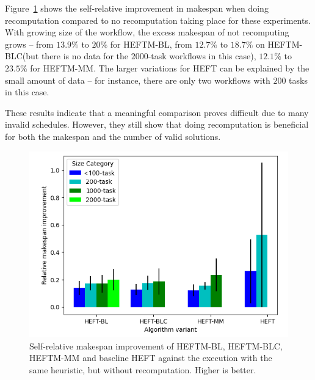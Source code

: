 \documentclass[conference]{IEEEtran}
\newcommand{\algo}[1]{\textsc{#1}}
\newcommand{\heft}{\algo{HEFT}\xspace}
\newcommand{\heftmm}{\algo{HEFTM-MM}\xspace}
\newcommand{\heftbl}{\algo{HEFTM-BL}\xspace}
\newcommand{\heftblc}{\algo{HEFTM-BLC}\xspace}
\newcommand{\new}[1]{{#1}}
\begin{document}
Figure~\ref{fig:updates-ms} shows \new{the self-relative improvement in makespan when doing recomputation 
compared to no recomputation taking place} for these experiments.
With growing size of the workflow, the excess makespan of not recomputing grows -- from $13.9\%$ to $20\%$ for \heftbl,
from $12.7\%$ to $18.7\%$ on \heftblc (but there is no data for the $2000$-task workflows in this case),
$12.1\%$ to $23.5\%$ for \heftmm.
The larger variations for \heft can be explained by the small amount of data -- for instance, there are
only \new{two workflows with  $200$ tasks in this case.}

\new{
These results indicate that a meaningful comparison proves difficult due to
many invalid schedules. However, they still show that doing recomputation 
is beneficial for both the makespan and the number of valid solutions.
}


\begin{figure}[tb]
    \centering
    \includegraphics[width=0.95\columnwidth] {images/UpdatesMss2}
    \caption{
    \new{Self-relative makespan improvement of \heftbl, \heftblc, \heftmm and baseline \heft against
    the execution with the same heuristic, but without recomputation. Higher is better. } }
    \label{fig:updates-ms}
\end{figure}
\end{document}
